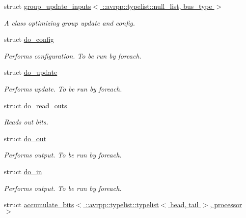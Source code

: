 \begin{DoxyCompactItemize}
struct \hyperlink{structavrpp_1_1bus_1_1group__update__inputs_3_01_1_1avrpp_1_1typelist_1_1null__list_00_01bus__type_01_4}{group\_\-update\_\-inputs$<$ ::avrpp::typelist::null\_\-list, bus\_\-type $>$}
\begin{DoxyCompactList}\small\item\em A class optimizing group update and config. \item\end{DoxyCompactList}\item 
struct \hyperlink{structavrpp_1_1bus_1_1do__config}{do\_\-config}
\begin{DoxyCompactList}\small\item\em Performs configuration. To be run by foreach. \item\end{DoxyCompactList}\item 
struct \hyperlink{structavrpp_1_1bus_1_1do__update}{do\_\-update}
\begin{DoxyCompactList}\small\item\em Performs update. To be run by foreach. \item\end{DoxyCompactList}\item 
struct \hyperlink{structavrpp_1_1bus_1_1do__read__outs}{do\_\-read\_\-outs}
\begin{DoxyCompactList}\small\item\em Reads out bits. \item\end{DoxyCompactList}\item 
struct \hyperlink{structavrpp_1_1bus_1_1do__out}{do\_\-out}
\begin{DoxyCompactList}\small\item\em Performs output. To be run by foreach. \item\end{DoxyCompactList}\item 
struct \hyperlink{structavrpp_1_1bus_1_1do__in}{do\_\-in}
\begin{DoxyCompactList}\small\item\em Performs output. To be run by foreach. \item\end{DoxyCompactList}\item 
struct \hyperlink{structavrpp_1_1bus_1_1accumulate__bits_3_01_1_1avrpp_1_1typelist_1_1typelist_3_01head_00_01tail_01_4_00_01processor_01_4}{accumulate\_\-bits$<$ ::avrpp::typelist::typelist$<$ head, tail $>$, processor $>$}

\end{DoxyCompactItemize}
